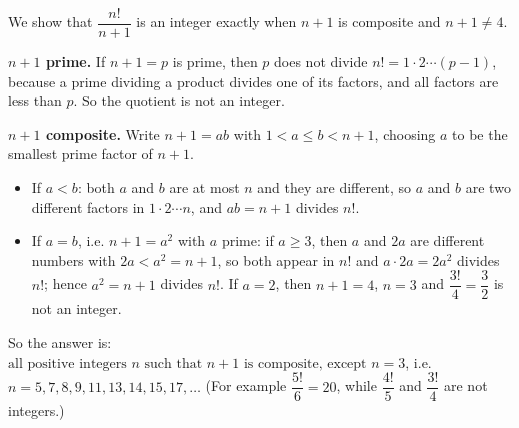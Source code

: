We show that $\dfrac{n!}{n+1}$ is an integer exactly when $n+1$ is composite and $n+1\ne4$.

\textbf{$n+1$ prime.} If $n+1=p$ is prime, then $p$ does not divide $n!=1\cdot2\cdots(p-1)$, because a prime dividing a product divides one of its factors, and all factors are less than $p$. So the quotient is not an integer.

\textbf{$n+1$ composite.} Write $n+1=ab$ with $1<a\le b<n+1$, choosing $a$ to be the smallest prime factor of $n+1$.
\begin{itemize}
\item If $a<b$: both $a$ and $b$ are at most $n$ and they are different, so $a$ and $b$ are two different factors in $1\cdot2\cdots n$, and $ab=n+1$ divides $n!$.
\item If $a=b$, i.e. $n+1=a^2$ with $a$ prime: if $a\ge3$, then $a$ and $2a$ are different numbers with $2a<a^2=n+1$, so both appear in $n!$ and $a\cdot2a=2a^2$ divides $n!$; hence $a^2=n+1$ divides $n!$. If $a=2$, then $n+1=4$, $n=3$ and $\dfrac{3!}{4}=\dfrac32$ is not an integer.
\end{itemize}

So the answer is: $\boxed{\text{all positive integers }n\text{ such that }n+1\text{ is composite, except }n=3}$, i.e. $n=5,7,8,9,11,13,14,15,17,\dots$ (For example $\dfrac{5!}{6}=20$, while $\dfrac{4!}{5}$ and $\dfrac{3!}{4}$ are not integers.)
